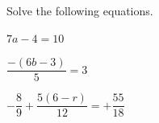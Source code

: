  Solve the following equations.

\begin{subparts}
  \item $7a-4=10$
  \item $\dfrac{-(6b-3)}{5}=3$
  \item $-\dfrac{8}{9}+\dfrac{5(6-r)}{12}=+\dfrac{55}{18}$
\end{subparts}

